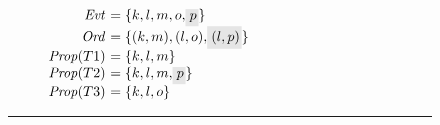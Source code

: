 \begin{figure}\ContinuedFloat
  \begin{subfigure}{.5\textwidth}
\begin{center}
\end{center}
    \caption{}
    \label{fig:armvpop:flpop:7}
  \end{subfigure}%
  \begin{subfigure}{.5\textwidth}
\begin{center}
\parbox{63mm}{$\begin{array}{@{}r@{~}l@{}}
  \Evt      &= \{k, l, m, o, \graybox{p}\} \\
  \Ord      &= \{ (k, m), (l, o), \graybox{(l, p)} \} \\
  \Prop(T1) &= \{k, l, m\} \\
  \Prop(T2) &= \{k, l, m, \graybox{p}\} \\
  \Prop(T3) &= \{k, l, o\} \\
\end{array}$}
\end{center}
    \caption{}
    \label{fig:armvpop:flpop:8}
  \end{subfigure}
  \hrule


\end{figure}
